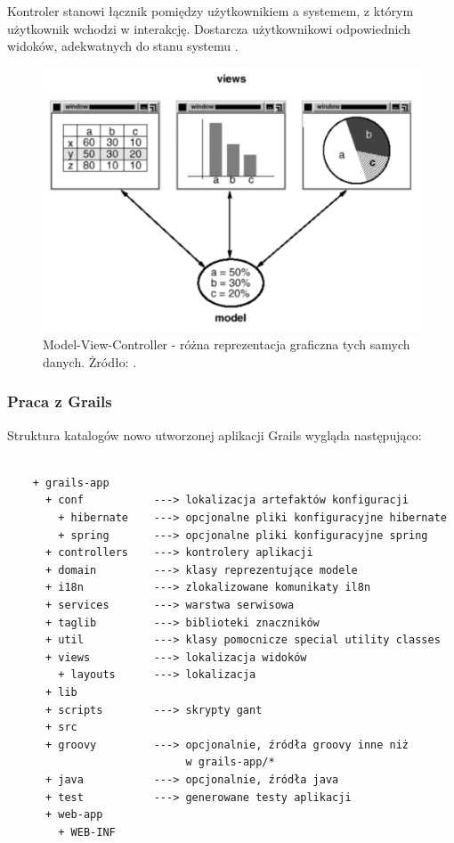     Kontroler stanowi łącznik pomiędzy użytkownikiem a systemem, z którym użytkownik wchodzi w interakcję. Dostarcza użytkownikowi odpowiednich widoków, adekwatnych do stanu systemu \cite{Trygve79}.

    \begin{figure}[t]
      \centering
      \includegraphics[width=1.0\textwidth]{img/mvc-1.pdf}
      \caption{Model-View-Controller - różna reprezentacja graficzna tych samych danych. Żródło: \cite{GoF}.}
      \label{fig:mvc-1}
    \end{figure}

    \subsubsection{Praca z Grails}

    Struktura katalogów nowo utworzonej aplikacji Grails wygląda następująco:

    \begin{verbatim}

    + grails-app
      + conf           ---> lokalizacja artefaktów konfiguracji
        + hibernate    ---> opcjonalne pliki konfiguracyjne hibernate
        + spring       ---> opcjonalne pliki konfiguracyjne spring 
      + controllers    ---> kontrolery aplikacji
      + domain         ---> klasy reprezentujące modele
      + i18n           ---> zlokalizowane komunikaty il8n
      + services       ---> warstwa serwisowa
      + taglib         ---> biblioteki znaczników
      + util           ---> klasy pomocnicze special utility classes 
      + views          ---> lokalizacja widoków
        + layouts      ---> lokalizacja 
      + lib
      + scripts        ---> skrypty gant
      + src
      + groovy         ---> opcjonalnie, źródła groovy inne niż
                            w grails-app/*
      + java           ---> opcjonalnie, źródła java 
      + test           ---> generowane testy aplikacji
      + web-app
        + WEB-INF

    \end{verbatim}

